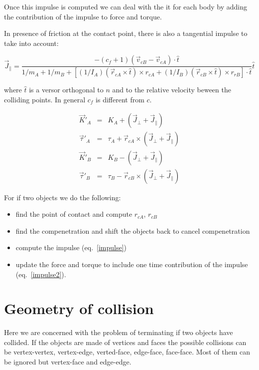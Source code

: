 \documentclass[12pt]{article}
\begin{document}
Once this impulse is computed we can deal with the it for each body by adding the contribution of the impulse to force and torque.

In presence of friction at the contact point, there is also a tangential impulse to take into account:

\begin{equation}
{\vec J}_{\parallel} = \frac{-(c_f+1) (\vec v_{cB} - \vec v_{cA}) \cdot \hat t}{1/m_A+1/m_B + \left[ (1/I_A)(\vec r_{cA} \times \hat t)\times r_{cA}  + (1/I_B)(\vec r_{cB} \times \hat t) \times r_{rB}\right] \cdot {\hat t}}{\hat t}
\label{impulse}
\end{equation}

where $\hat t$ is a versor orthogonal to $n$ and to the relative velocity beween the colliding points. In general $c_f$ is different from $c$.

\begin{eqnarray}
\vec K'_A &=& K_A + (\vec J_{\perp}+\vec J_{\parallel}) \\
\vec \tau'_A &=& \tau_A + \vec r_{cA} \times (\vec J_{\perp}+\vec J_{\parallel}) \\
\vec K'_B &=& K_B - (\vec J_{\perp}+\vec J_{\parallel}) \\
\vec \tau'_B &=& \tau_B - \vec r_{cB} \times (\vec J_{\perp}+\vec J_{\parallel}) 
\label{impulse2}
\end{eqnarray}

For if two objects we do the following:
\begin{itemize}
\item find the point of contact and compute $r_{cA}$, $r_{cB}$
\item find the compenetration and shift the objects back to cancel compenetration
\item compute the impulse (eq.~\ref{impulse})
\item update the force and torque to include one time contribution of the impulse (eq.~\ref{impulse2}).
\end{itemize}

\section{Geometry of collision}

Here we are concerned with the problem of terminating if two objects have collided. If the objects are made of vertices and faces the possible collisions can be vertex-vertex, vertex-edge, verted-face, edge-face, face-face. Most of them can be ignored but vertex-face and edge-edge.
\end{document}
